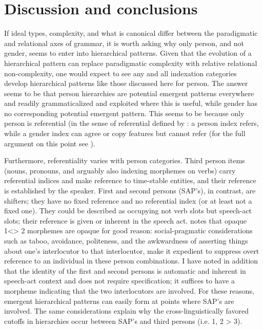 \documentclass[output=paper,hidelinks]{langscibook}
\begin{document}
\section{Discussion and conclusions}

If ideal types, complexity, and what is canonical differ between the paradigmatic and relational axes of grammar, it is worth asking why only person, and not gender, seems to enter into hierarchical patterns.  Given that the evolution of a hierarchical pattern can replace paradigmatic complexity with relative relational non-complexity, one would expect to see any and all indexation categories develop hierarchical patterns like those discussed here for person.  The answer seems to be that person hierarchies are potential emergent patterns everywhere and readily grammaticalized and exploited where this is useful, while gender has no corresponding potential emergent pattern.  This seems to be because only person is referential (in the sense of referential defined by \citealt{Kibrik2011}:  a person index refers, while a gender index can agree or copy features but cannot refer (for the full argument on this point see \citealt[\S5]{Nicholsa}). 

Furthermore, referentiality varies with person categories.  Third person items (nouns, pronouns, and arguably also indexing morphemes on verbs) carry referential indices and make reference to time-stable entities, and their reference is established by the speaker.  First and second persons (SAP's), in contrast, are shifters; they have no fixed reference and no referential index (or at least not a fixed one).  They could be described as occupying not verb slots but speech-act slots; their reference is given or inherent in the speech act. \citet{Heath1991,Heath1998} notes that opaque 1<> 2 morphemes are opaque for good reason:  social-pragmatic considerations such as taboo, avoidance, politeness, and the awkwardness of asserting things about one's interlocutor to that interlocutor, make it expedient to suppress overt reference to an individual in these person combinations.  I have noted in addition that the identity of the first and second persons is automatic and inherent in speech-act context and does not require specification; it suffices to have a morpheme indicating that the two interlocutors are involved.  For these reasons, emergent hierarchical patterns can easily form at points where SAP's are involved.  The same considerations explain why the cross-linguistically favored cutoffs in hierarchies occur between SAP's and third persons (i.e. 1, 2 > 3). 
\end{document}
